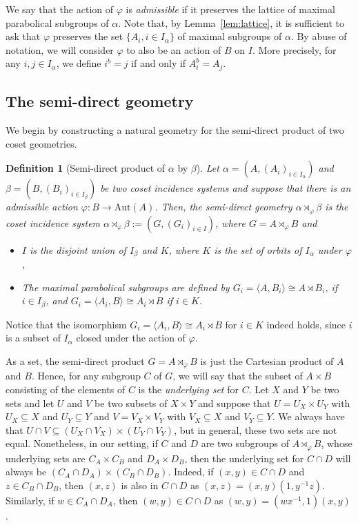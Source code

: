 \documentclass[11pt,letterpaper]{amsart}
\newtheorem{definition}[prop]{Definition}
\newcommand{\Aut}{\mathrm{Aut}}
\begin{document}
We say that the action of $\varphi$ is \textit{admissible} if it preserves the lattice of maximal parabolical subgroups of $\alpha$. Note that, by Lemma~\ref{lem:lattice}, it is sufficient to ask that $\varphi$ preserves the set $\{A_i, i \in I_\alpha\}$ of maximal subgroups of $\alpha$. By abuse of notation, we will consider $\varphi$ to also be an action of $B$ on $I$. More precisely, for any $i,j \in I_\alpha$, we define $i^b = j$ if and only if $A_i^b = A_j$.

\subsection{The semi-direct geometry}\label{sec:split:subsec:semidirect}
We begin by constructing a natural geometry for the semi-direct product of two coset geometries.
\begin{definition}[Semi-direct product of $\alpha$ by $\beta$]
    Let $\alpha = (A,(A_i)_{i \in I_\alpha})$ and $\beta = (B,(B_i)_{i \in I_\beta})$ be two coset incidence systems and suppose that there is an admissible action $\varphi \colon B \to \Aut(A)$. Then, the semi-direct geometry $\alpha \rtimes_\varphi \beta$ is the coset incidence system $\alpha \rtimes_\varphi \beta := (G, (G_i)_{i \in I})$, where $G = A \rtimes_\varphi B$ and
    \begin{itemize}
        \item $I$ is the disjoint union of $I_\beta$ and $K$, where $K$ is the set of orbits of $I_\alpha$ under $\varphi$,
        \item The maximal parabolical subgroups are defined by $G_i = \langle A, B_i \rangle \cong A \rtimes B_i$, if $i \in I_\beta$, and $G_i = \langle A_i, B \rangle \cong A_i \rtimes B$ if $i \in K$.
    \end{itemize}
\end{definition}

Notice that the isomorphism $G_i = \langle A_i, B \rangle \cong A_i \rtimes B$ for $i \in K$ indeed holds, since $i$ is a subset of $I_\alpha$ closed under the action of $\varphi$.

As a set, the semi-direct product $G = A \rtimes_\varphi B$ is just the Cartesian product of $A$ and $B$. Hence, for any subgroup $C$ of $G$, we will say that the subset of $A \times B$ consisting of the elements of $C$ is the \emph{underlying set} for $C$. Let $X$ and $Y$ be two sets and let $U$ and $V$ be two subsets of $X \times Y$ and suppose that $U = U_X \times U_Y$ with $U_X \subseteq X$ and $U_Y \subseteq Y$ and $V = V_X \times V_Y$ with $V_X \subseteq X$ and $V_Y \subseteq Y$. We always have that $U \cap V \subseteq (U_X \cap V_X) \times (U_Y \cap V_Y)$, but in general, these two sets are not equal. Nonetheless, in our setting, if $C$ and $D$ are two subgroups of $A \rtimes_\varphi B$, whose underlying sets are $C_A \times C_B$ and $D_A \times D_B$, then the underlying set for $C \cap D$ will always be $(C_A \cap D_A) \times (C_B \cap D_B)$. Indeed, if $(x,y) \in C \cap D$ and $z \in C_B \cap D_B$, then $(x,z)$ is also in $C \cap D$ as $(x,z) = (x,y) (1, y^{-1}z)$. Similarly, if $w \in C_A \cap D_A$, then $(w,y) \in C \cap D$ as $(w,y) = (wx^{-1},1)(x,y) $.
\end{document}
